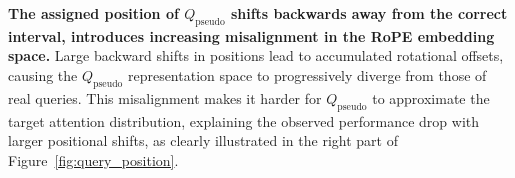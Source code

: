 \textbf{The assigned position of \texorpdfstring{\(Q_{\text{pseudo}}\)}{Q\_pseudo} shifts backwards away from the correct interval, introduces increasing misalignment in the RoPE embedding space.} Large backward shifts in positions lead to accumulated rotational offsets, causing the \texorpdfstring{\(Q_{\text{pseudo}}\)}{Q\_pseudo} representation space to progressively diverge from those of real queries. This misalignment makes it harder for \texorpdfstring{\(Q_{\text{pseudo}}\)}{Q\_pseudo} to approximate the target attention distribution, explaining the observed performance drop with larger positional shifts, as clearly illustrated in the right part of Figure~\ref{fig:query_position}.